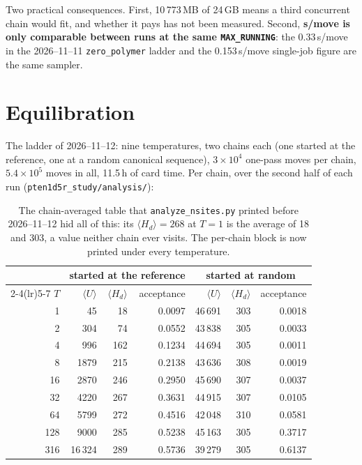 \documentclass[11pt,a4paper]{article}
\newcommand{\Hd}{H_d}
\newcommand{\file}[1]{\texttt{#1}}
\begin{document}
\noindent
Two practical consequences. First, 10\,773\,MB of 24\,GB means a third
concurrent chain would fit, and whether it pays has not been measured. Second,
\textbf{s/move is only comparable between runs at the same
\texttt{MAX\_RUNNING}}: the 0.33\,s/move in the 2026--11--11
\file{zero\_polymer} ladder and the 0.153\,s/move single-job figure are the
same sampler.

\section{Equilibration}

The ladder of 2026--11--12: nine temperatures, two chains each (one started at
the reference, one at a random canonical sequence), $3\times10^4$ one-pass
moves per chain, $5.4\times10^5$ moves in all, 11.5\,h of card time. Per chain,
over the second half of each run (\file{pten1d5r\_study/analysis/}):

\begin{table}[h]
\centering
\begin{tabular}{rrrrrrr}
\toprule
 & \multicolumn{3}{c}{started at the reference} & \multicolumn{3}{c}{started at random} \\
\cmidrule(lr){2-4}\cmidrule(lr){5-7}
$T$ & $\langle U\rangle$ & $\langle \Hd\rangle$ & acceptance & $\langle U\rangle$ & $\langle \Hd\rangle$ & acceptance \\
\midrule
1   &    45 &  18 & 0.0097 & 46\,691 & 303 & 0.0018 \\
2   &   304 &  74 & 0.0552 & 43\,838 & 305 & 0.0033 \\
4   &   996 & 162 & 0.1234 & 44\,694 & 305 & 0.0011 \\
8   &  1879 & 215 & 0.2138 & 43\,636 & 308 & 0.0019 \\
16  &  2870 & 246 & 0.2950 & 45\,690 & 307 & 0.0037 \\
32  &  4220 & 267 & 0.3631 & 44\,915 & 307 & 0.0105 \\
64  &  5799 & 272 & 0.4516 & 42\,048 & 310 & 0.0581 \\
128 &  9000 & 285 & 0.5238 & 45\,163 & 305 & 0.3717 \\
316 & 16\,324 & 289 & 0.5736 & 39\,279 & 305 & 0.6137 \\
\bottomrule
\end{tabular}
\caption{The chain-averaged table that \file{analyze\_nsites.py} printed before
2026--11--12 hid all of this: its $\langle \Hd\rangle = 268$ at $T=1$ is the
average of 18 and 303, a value neither chain ever visits. The per-chain block
is now printed under every temperature.}
\end{table}
\end{document}
